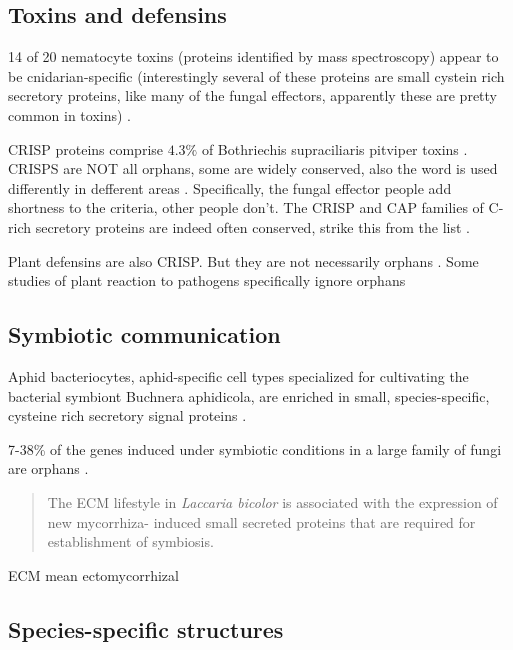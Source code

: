 \subsection{Toxins and defensins}

14 of 20 nematocyte toxins (proteins identified by mass spectroscopy) appear to
be cnidarian-specific (interestingly several of these proteins are small
cystein rich secretory proteins, like many of the fungal effectors, apparently
these are pretty common in toxins) \cite{moran_analysis_2012}.

CRISP proteins comprise $4.3\%$ of Bothriechis supraciliaris pitviper toxins
\cite{lomonte_snake_2012}. CRISPS are NOT all orphans, some are widely
conserved, also the word is used differently in defferent areas
\cite{yamazaki_wide_2003}. Specifically, the fungal effector people add
shortness to the criteria, other people don't. The CRISP and CAP families of
C-rich secretory proteins are indeed often conserved, strike this from the list
\cite{schreiber_novel_1997}.

Plant defensins are also CRISP. But they are not necessarily orphans
\cite{rogozhin_novel_2011}. Some studies of plant reaction to pathogens
specifically ignore orphans \cite{portillo_distinct_2013}

\subsection{Symbiotic communication}

    Aphid bacteriocytes, aphid-specific cell types specialized for cultivating the
    bacterial symbiont Buchnera aphidicola, are enriched in small, species-specific,
    cysteine rich secretory signal proteins \cite{shigenobu_aphids_2012}.

    7-38\% of the genes induced under symbiotic conditions in a large family of
    fungi are orphans \cite{kohler_convergent_2015}.

    \begin{quote}
        The ECM lifestyle in \emph{Laccaria bicolor} is associated with the expression of
         new mycorrhiza- induced small secreted proteins that are required for
         establishment of symbiosis.
     \end{quote}

     ECM mean ectomycorrhizal

\subsection{Species-specific structures}

